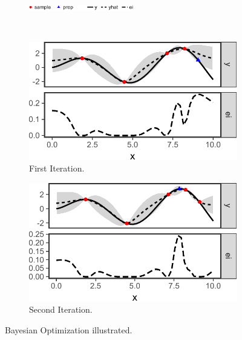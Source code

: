 \begin{figure}
  \begin{subfigure}{\textwidth}
    \centering
    \includegraphics[width=0.5\textwidth]{figures/bo-legend.pdf}
  \end{subfigure}
  \vspace{0.2em}
  \\
  \centering
  \begin{subfigure}{0.45\textwidth}
    \centering
    \includegraphics[width=\textwidth]{figures/bo1.pdf}
    \caption{First Iteration.}
  \end{subfigure}
  \hspace{1em}
  \begin{subfigure}{0.45\textwidth}
    \centering
    \includegraphics[width=\textwidth]{figures/bo2.pdf}
    \caption{Second Iteration.}
  \end{subfigure}
  \caption{Bayesian Optimization illustrated.}
  \label{fig:bo-1d}
\end{figure}

